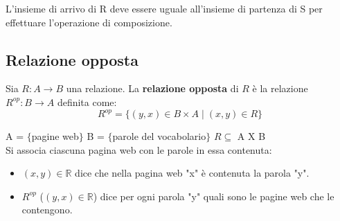 \begin{note}
	L'insieme di arrivo di R deve essere uguale all'insieme di partenza di S per effettuare l'operazione di composizione.
\end{note}

\begin{example}
\end{example}

\subsection{Relazione opposta}
\begin{definition}
Sia $R:A\rightarrow B$ una relazione. La \textbf{relazione opposta} di $R$ è la relazione $R^{op}:B\rightarrow A$ definita come: 
\begin{equation}
	R^{op} = \{(y, x) \in B \times A \mid (x, y) \in R\}
\end{equation}
\end{definition}

\begin{example}
    A = $\{$pagine web$\}$ \hspace{.5cm} B = $\{$parole del vocabolario$\}$ \hspace{.5cm} $R \subseteq$ A X B\\
    Si associa ciascuna pagina web con le parole in essa contenuta:
    \begin{itemize}
        \item $(x, y) \in \mathbb{R}$ dice che nella pagina web "x" è contenuta la parola "y".
        \item $R^{op}$ ($(y, x) \in \mathbb{R}$) dice per ogni parola "y" quali sono le pagine web che le contengono.
    \end{itemize}
\end{example}

